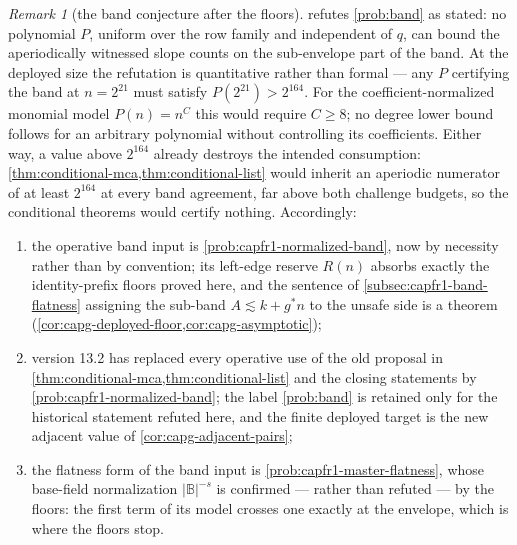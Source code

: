 \documentclass[11pt]{article}
\theoremstyle{definition}
\theoremstyle{remark}
\newtheorem{remark}[remark]{Remark}
\newcommand{\B}{\mathbb{B}}
\begin{document}
\begin{remark}[the band conjecture after the floors]\label{rem:capg-band}
 refutes \cref{prob:band} as stated: no
polynomial $P$, uniform over the row family and independent of $q$, can
bound the aperiodically witnessed slope counts on the sub-envelope part
of the band.  At the deployed size the refutation is quantitative rather
than formal --- any $P$ certifying the band at $n=2^{21}$ must satisfy
$P(2^{21})>2^{164}$.  For the coefficient-normalized monomial model $P(n)=n^C$ this would require $C\ge8$; no degree lower bound follows for an arbitrary polynomial without controlling its coefficients.  Either way, a value above $2^{164}$ already destroys
the intended consumption: \cref{thm:conditional-mca,thm:conditional-list}
would inherit an aperiodic numerator of at least $2^{164}$ at every band
agreement, far above both challenge budgets, so the conditional theorems
would certify nothing.  Accordingly:
\begin{enumerate}[label=\textup{(\roman*)}]
\item the operative band input is \cref{prob:capfr1-normalized-band}, now
by necessity rather than by convention; its left-edge reserve $R(n)$
absorbs exactly the identity-prefix floors proved here, and the sentence
of \cref{subsec:capfr1-band-flatness} assigning the sub-band
$A\lesssim k+g^{*}n$ to the unsafe side is a theorem
(\cref{cor:capg-deployed-floor,cor:capg-asymptotic});
\item version 13.2 has replaced every operative use of the old proposal in
\cref{thm:conditional-mca,thm:conditional-list} and the closing statements
by \cref{prob:capfr1-normalized-band}; the label \cref{prob:band} is retained
only for the historical statement refuted here, and the finite deployed target
is the new adjacent value of \cref{cor:capg-adjacent-pairs};
\item the flatness form of the band input is
\cref{prob:capfr1-master-flatness}, whose base-field normalization
$|\B|^{-s}$ is confirmed --- rather than refuted --- by the floors: the
first term of its model crosses one exactly at the envelope, which is
where the floors stop.
\end{enumerate}
\end{remark}
\end{document}
